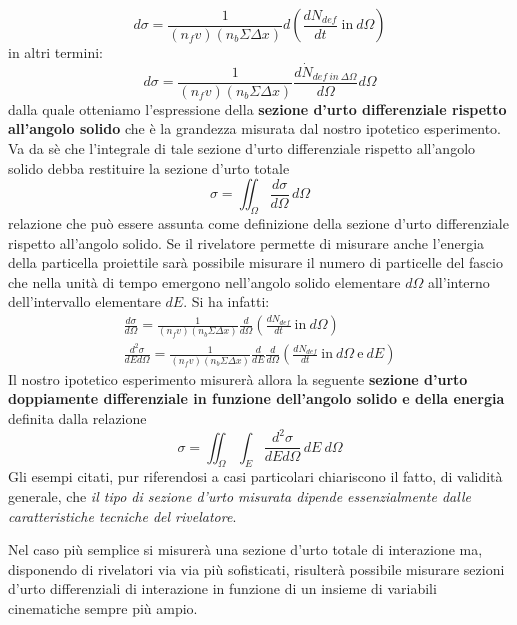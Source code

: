 \[
	d \sigma = \frac{1}{(n_fv)(n_b \Sigma \Delta x)}d \left( \frac{dN_{def}}{dt} \ \text{in} \ d\Omega\right)
\]
in altri termini:
\[
	d \sigma = \frac{1}{(n_fv)(n_b \Sigma \Delta x)} \frac{d\dot{N}_{def \ in \ \Delta \Omega}}{d \Omega} d \Omega
\]
dalla quale otteniamo l'espressione della \textbf{sezione d'urto
differenziale rispetto all'angolo solido} che è la grandezza misurata
dal nostro ipotetico esperimento.
Va da sè che l'integrale di tale
sezione d'urto differenziale rispetto all'angolo solido debba restituire
la sezione d'urto totale
\begin{equation}
	\boxed{ \sigma = \iint_{\Omega}\frac{d \sigma}{d \Omega} \, d \Omega }
	\label{eq:cross-section-solid-angle}
\end{equation}
relazione che può essere assunta come definizione della sezione d'urto
differenziale rispetto all'angolo solido.
Se il rivelatore permette di misurare anche l'energia della particella proiettile sarà possibile
misurare il numero di particelle del fascio che nella unità di tempo
emergono nell'angolo solido elementare \(d \Omega\) all'interno
dell'intervallo elementare \(dE\).
Si ha infatti:
\begin{gather*}
	\frac{d \sigma}{d \Omega} = \frac{1}{(n_fv)(n_b \Sigma \Delta x)}\frac{d}{d \Omega} \left( \frac{dN_{def}}{dt} \ \text{in} \ d\Omega\right)\\
	\frac{d^2 \sigma}{dE d \Omega} = \frac{1}{(n_fv)(n_b \Sigma \Delta x)}\frac{d}{dE}\frac{d}{d \Omega} \left( \frac{dN_{def}}{dt} \ \text{in} \ d\Omega \ \text{e} \ dE\right)
\end{gather*}
Il nostro ipotetico esperimento misurerà allora la seguente
\textbf{sezione d'urto doppiamente differenziale in funzione dell'angolo
solido e della energia} definita dalla relazione
\[
	\sigma = \iint_{\Omega}\int_{E} \frac{d^2 \sigma}{dE d \Omega} \, dE \ d \Omega
\]
Gli esempi citati, pur riferendosi a casi particolari chiariscono il fatto, di validità generale, che \emph{il tipo di sezione d'urto misurata dipende essenzialmente dalle caratteristiche tecniche del rivelatore}.

Nel caso più semplice si misurerà una sezione d'urto totale di interazione ma, disponendo di rivelatori via via più sofisticati, risulterà possibile misurare sezioni d'urto differenziali di interazione in funzione di un insieme di variabili cinematiche sempre più ampio.

